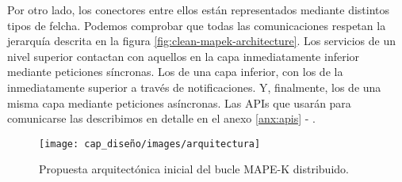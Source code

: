 Por otro lado, los conectores entre ellos están representados mediante distintos tipos de felcha. Podemos comprobar que todas las comunicaciones respetan la jerarquía descrita en la figura \ref{fig:clean-mapek-architecture}. Los servicios de un nivel superior contactan con aquellos en la capa inmediatamente inferior mediante peticiones síncronas. Los de una capa inferior, con los de la inmediatamente superior a través de notificaciones. Y, finalmente, los de una misma capa mediante peticiones asíncronas. Las APIs que usarán para comunicarse las describimos en detalle en el anexo \ref{anx:apis} - .


\begin{figure}[h!]
  \hspace{-1cm}
  \texttt{[image: cap\_diseño/images/arquitectura]}
  \caption{Propuesta arquitectónica inicial del bucle MAPE-K distribuido.}
  \label{fig:arquitectura-sistema}
\end{figure}
